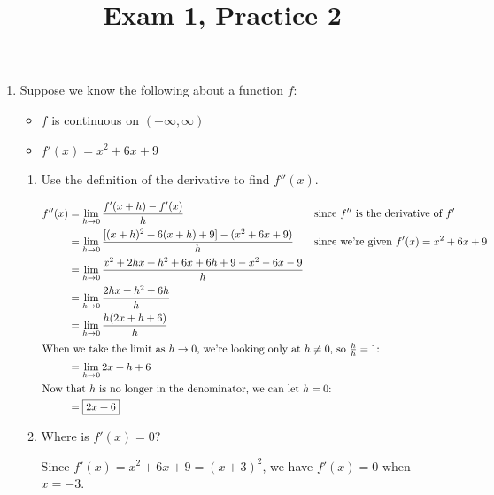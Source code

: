 \documentclass{article}
\theoremstyle{theorem}
\begin{document}
  \title{Exam 1, Practice 2}


\listofproblems

\begin{enumerate}
\item \label{2023-e1practice-graphing-1-v2}  

  Suppose we know the following about a function $f$:
  \begin{itemize}[nosep]
  \item $f$ is continuous on $(-\infty, \infty)$
  \item $f'(x) = x^2 + 6x + 9$
  \end{itemize}
  \begin{enumerate}
  \item \label{2023-e1practice-graphing-1-deriv}
    \begin{problem}[\vfill]
      Use the definition of the derivative to find $f''(x)$. 
    \end{problem}

    \begin{solution}
      \begin{alignat*}{3}
        f''(x) &= \lim_{h \to 0} \frac{f'(x + h) - f'(x)}{h} & & \text{since $f''$ is the derivative of $f'$} \\
        &= \lim_{h \to 0} \frac{[(x + h)^2 + 6 (x + h) + 9 ]- (x^2 + 6x + 9)}{h} && \text{since we're given $f'(x) = x^2 + 6x + 9$} \\
        &= \lim_{h \to 0} \frac{x^2 + 2hx + h^2 + 6x + 6h + 9 - x^2 - 6x - 9}{h} \\
        &= \lim_{h \to 0} \frac{2hx + h^2 + 6h}{h} \\
        &= \lim_{h \to 0} \frac{h(2x + h + 6)}{h} \\
        \intertext{When we take the limit as $h \to 0$, we're looking only at $h \neq 0$, so $\frac{h}{h} = 1$:}
        &= \lim_{h \to 0} 2x + h + 6 \\
        \intertext{Now that $h$ is no longer in the denominator, we can let $h = 0$:} %
        &= \boxed{2x + 6}
      \end{alignat*}
    \end{solution}

  \item
    \begin{problem}[\nstretch{0.25}]
      Where is $f'(x) = 0$? 
    \end{problem}

    \begin{solution}
      Since $f'(x) = x^2 + 6x + 9 = (x + 3)^2$, we have $f'(x) = 0$ when $x = \boxed{-3}$. 
    \end{solution}


\end{enumerate}
\end{enumerate}
\end{document}
